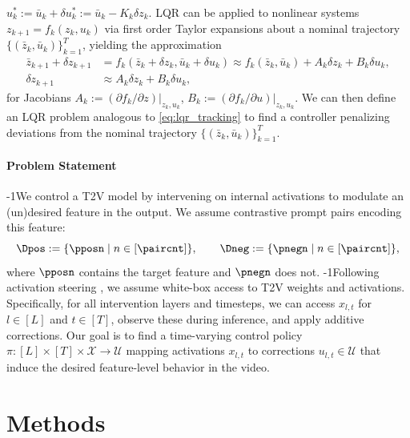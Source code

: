 \documentclass{article}
\begin{document}
$u^*_k := \bar u_k +\delta u^*_k := \bar u_k -K_k\delta z_k$.
LQR can be applied to nonlinear systems $z_{k+1} = f_k(z_k, u_k)$ via first order Taylor expansions about a nominal trajectory $\{(\bar z_k, \bar u_k)\}_{k=1}^T$, yielding the approximation
\begin{equation}\label{lqr_linearization}
\begin{aligned}
    \bar z_{k+1} + \delta z_{k+1} &= f_k(\bar z_k + \delta z_k, \bar u_k + \delta u_k) \approx f_k(\bar z_k,\bar u_k) + A_k\delta z_k + B_k\delta u_k, \\ 
    \delta z_{k+1} &\approx A_k\delta z_k + B_k\delta u_k,
\end{aligned}
\end{equation}
for Jacobians $A_k:=(\partial f_k/\partial z)|_{z_k,u_k}$, $B_k := (\partial f_k/\partial u)|_{z_k,u_k}$. We can then define an LQR problem analogous to \eqref{eq:lqr_tracking} to find a controller penalizing deviations from the nominal trajectory $\{(\bar z_k, \bar u_k)\}_{k=1}^T$.


\vspace{-8pt}
\paragraph{Problem Statement}
\looseness-1We control a T2V model by intervening on internal activations to modulate an (un)desired feature in the output. We assume contrastive prompt pairs encoding this feature:
\begin{equation}\label{eq:contrastive_dataset}
\Dpos := \{\pposn \mid n \in [\paircnt]\},\qquad \Dneg := \{\pnegn \mid n \in [\paircnt]\},
\end{equation}
where $\pposn$ contains the target feature and $\pnegn$ does not. 
\looseness-1Following activation steering \cite{turner2024activation, ode_activation_steering, skifstad2026local}, we assume white-box access to T2V weights and activations. Specifically, for all intervention layers and timesteps, we can access $x_{l,t}$ for $l\in[L]$ and $t\in[T]$, observe these during inference, and apply additive corrections. Our goal is to find a time-varying control policy $\pi:[L]\times[T]\times\mathcal{X}\rightarrow\mathcal{U}$ mapping activations $x_{l,t}$ to corrections $u_{l,t} \in \mathcal{U}$ that induce the desired feature-level behavior in the video.

\vspace{-8pt}
\section{Methods}
\label{sec:methods}
\vspace{-8pt}
\end{document}
